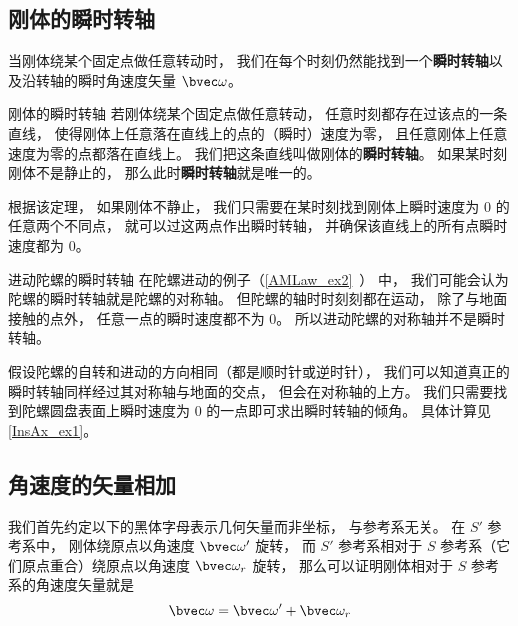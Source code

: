 


\subsection{刚体的瞬时转轴}
当刚体绕某个固定点做任意转动时， 我们在每个时刻仍然能找到一个\textbf{瞬时转轴}以及沿转轴的瞬时角速度矢量 $\bvec \omega$。

\begin{theorem}{刚体的瞬时转轴}
若刚体绕某个固定点做任意转动， 任意时刻都存在过该点的一条直线， 使得刚体上任意落在直线上的点的（瞬时）速度为零， 且任意刚体上任意速度为零的点都落在直线上。 我们把这条直线叫做刚体的\textbf{瞬时转轴}。 如果某时刻刚体不是静止的， 那么此时\textbf{瞬时转轴}就是唯一的。
\end{theorem}
根据该定理， 如果刚体不静止， 我们只需要在某时刻找到刚体上瞬时速度为 0 的任意两个不同点， 就可以过这两点作出瞬时转轴， 并确保该直线上的所有点瞬时速度都为 0。

\begin{example}{进动陀螺的瞬时转轴}\label{InsAx_ex2}
在陀螺进动的例子（\autoref{AMLaw_ex2}~） 中， 我们可能会认为陀螺的瞬时转轴就是陀螺的对称轴。 但陀螺的轴时时刻刻都在运动， 除了与地面接触的点外， 任意一点的瞬时速度都不为 0。 所以进动陀螺的对称轴并不是瞬时转轴。

假设陀螺的自转和进动的方向相同（都是顺时针或逆时针）， 我们可以知道真正的瞬时转轴同样经过其对称轴与地面的交点， 但会在对称轴的上方。 我们只需要找到陀螺圆盘表面上瞬时速度为 0 的一点即可求出瞬时转轴的倾角。 具体计算见\autoref{InsAx_ex1}。
\end{example}

\subsection{角速度的矢量相加}

我们首先约定以下的黑体字母表示几何矢量而非坐标， 与参考系无关。 在 $S'$ 参考系中， 刚体绕原点以角速度 $\bvec \omega'$ 旋转， 而 $S'$ 参考系相对于 $S$ 参考系（它们原点重合）绕原点以角速度 $\bvec \omega_r$ 旋转， 那么可以证明刚体相对于 $S$ 参考系的角速度矢量就是
\begin{equation}\label{InsAx_eq1}
\bvec \omega = \bvec \omega' + \bvec \omega_r
\end{equation}

